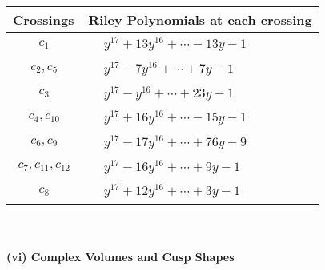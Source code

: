 \documentclass[1p]{elsarticle_modified}
\theoremstyle{definition}
\begin{document}
\begin{tabular}{m{50pt}|m{274pt}}
Crossings & \hspace{64pt}Riley Polynomials at each crossing \\
\hline $$\begin{aligned}c_{1}\end{aligned}$$&$\begin{aligned}
&y^{17}+13 y^{16}+\cdots-13 y-1
\end{aligned}$\\
\hline $$\begin{aligned}c_{2},c_{5}\end{aligned}$$&$\begin{aligned}
&y^{17}-7 y^{16}+\cdots+7 y-1
\end{aligned}$\\
\hline $$\begin{aligned}c_{3}\end{aligned}$$&$\begin{aligned}
&y^{17}- y^{16}+\cdots+23 y-1
\end{aligned}$\\
\hline $$\begin{aligned}c_{4},c_{10}\end{aligned}$$&$\begin{aligned}
&y^{17}+16 y^{16}+\cdots-15 y-1
\end{aligned}$\\
\hline $$\begin{aligned}c_{6},c_{9}\end{aligned}$$&$\begin{aligned}
&y^{17}-17 y^{16}+\cdots+76 y-9
\end{aligned}$\\
\hline $$\begin{aligned}c_{7},c_{11},c_{12}\end{aligned}$$&$\begin{aligned}
&y^{17}-16 y^{16}+\cdots+9 y-1
\end{aligned}$\\
\hline $$\begin{aligned}c_{8}\end{aligned}$$&$\begin{aligned}
&y^{17}+12 y^{16}+\cdots+3 y-1
\end{aligned}$\\
\hline
\end{tabular}\\~\\
\newpage\flushleft \textbf{(vi) Complex Volumes and Cusp Shapes}
\end{document}

